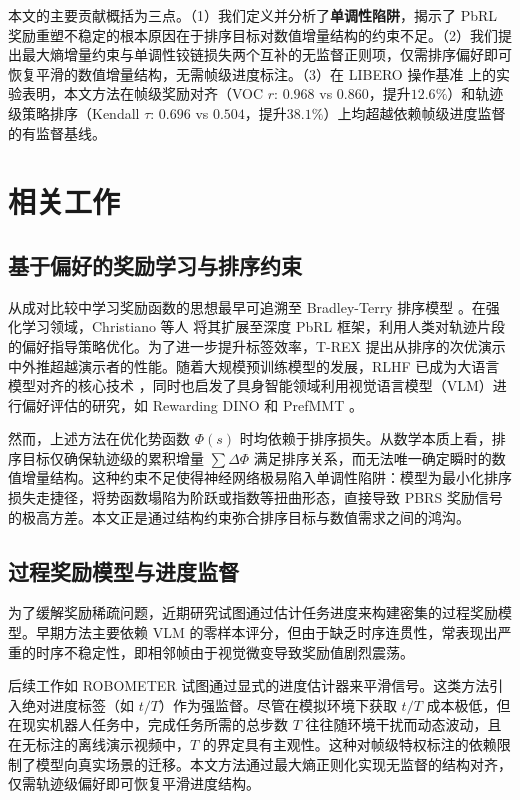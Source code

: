 本文的主要贡献概括为三点。（1）我们定义并分析了\textbf{单调性陷阱}，揭示了 PbRL 奖励重塑不稳定的根本原因在于排序目标对数值增量结构的约束不足。（2）我们提出最大熵增量约束与单调性铰链损失两个互补的无监督正则项，仅需排序偏好即可恢复平滑的数值增量结构，无需帧级进度标注。（3）在 LIBERO 操作基准 \cite{liu2023libero} 上的实验表明，本文方法在帧级奖励对齐（VOC $r$: $0.968$ vs $0.860$，提升$12.6\%$）和轨迹级策略排序（Kendall $\tau$: $0.696$ vs $0.504$，提升$38.1\%$）上均超越依赖帧级进度监督的有监督基线。

\section{相关工作}

\subsection{基于偏好的奖励学习与排序约束}

从成对比较中学习奖励函数的思想最早可追溯至 Bradley-Terry 排序模型 \cite{bradley1952}。在强化学习领域，Christiano 等人 \cite{christiano2017deep} 将其扩展至深度 PbRL 框架，利用人类对轨迹片段的偏好指导策略优化。为了进一步提升标签效率，T-REX \cite{brown2019extrapolating} 提出从排序的次优演示中外推超越演示者的性能。随着大规模预训练模型的发展，RLHF 已成为大语言模型对齐的核心技术 \cite{ouyang2022training}，同时也启发了具身智能领域利用视觉语言模型（VLM）进行偏好评估的研究，如 Rewarding DINO \cite{krack2026rewarding} 和 PrefMMT \cite{zhao2025}。

然而，上述方法在优化势函数 $\Phi(s)$ 时均依赖于排序损失。从数学本质上看，排序目标仅确保轨迹级的累积增量 $\sum \Delta\Phi$ 满足排序关系，而无法唯一确定瞬时的数值增量结构。这种约束不足使得神经网络极易陷入单调性陷阱：模型为最小化排序损失走捷径，将势函数塌陷为阶跃或指数等扭曲形态，直接导致 PBRS 奖励信号的极高方差。本文正是通过结构约束弥合排序目标与数值需求之间的鸿沟。

\subsection{过程奖励模型与进度监督}

为了缓解奖励稀疏问题，近期研究试图通过估计任务进度来构建密集的过程奖励模型。早期方法主要依赖 VLM 的零样本评分，但由于缺乏时序连贯性，常表现出严重的时序不稳定性，即相邻帧由于视觉微变导致奖励值剧烈震荡。

后续工作如 ROBOMETER \cite{robometer2026} 试图通过显式的进度估计器来平滑信号。这类方法引入绝对进度标签（如 $t/T$）作为强监督。尽管在模拟环境下获取 $t/T$ 成本极低，但在现实机器人任务中，完成任务所需的总步数 $T$ 往往随环境干扰而动态波动，且在无标注的离线演示视频中，$T$ 的界定具有主观性。这种对帧级特权标注的依赖限制了模型向真实场景的迁移。本文方法通过最大熵正则化实现无监督的结构对齐，仅需轨迹级偏好即可恢复平滑进度结构。

